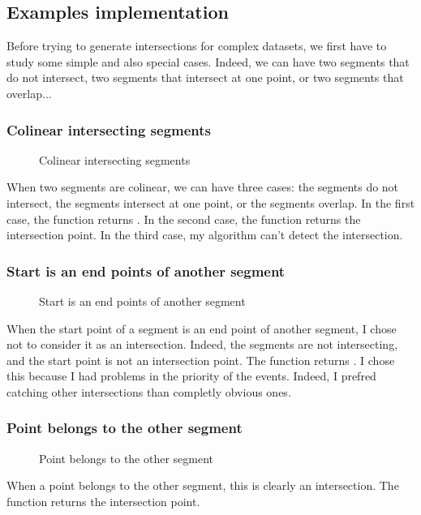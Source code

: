 \documentclass[10pt,a4paper,hidelinks]{article}
\begin{document}
\subsection{Examples implementation}
Before trying to generate intersections for complex datasets, we first have to study some simple and also special cases. Indeed, we can have two segments that do not intersect, two segments that intersect at one point, or two segments that overlap...
\subsubsection{Colinear intersecting segments}
\begin{figure}[h!]
    \centering
    
    \caption{Colinear intersecting segments}
\end{figure}
When two segments are colinear, we can have three cases: the segments do not intersect, the segments intersect at one point, or the segments overlap. In the first case, the function returns . In the second case, the function returns the intersection point. In the third case, my algorithm can't detect the intersection.

\subsubsection{Start is an end points of another segment}
\begin{figure}[h!]
    \centering
    
    \caption{Start is an end points of another segment}
\end{figure}
When the start point of a segment is an end point of another segment, I chose not to consider it as an intersection. Indeed, the segments are not intersecting, and the start point is not an intersection point. The function returns . I chose this because I had problems in the priority of the events. Indeed, I prefred catching other intersections than completly obvious ones.

\subsubsection{Point belongs to the other segment}
\begin{figure}[h!]
    \centering
    
    \caption{Point belongs to the other segment}
\end{figure}
When a point belongs to the other segment, this is clearly an intersection. The function returns the intersection point.
\end{document}
